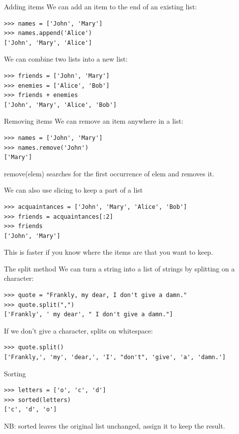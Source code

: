 \documentclass[aspectratio=169,usenames,dvipsnames]{beamer}
\begin{document}
\begin{frame}[fragile]{Adding items}
We can add an item to the end of an existing list:
\begin{lstlisting} 
>>> names = ['John', 'Mary']
>>> names.append('Alice')
['John', 'Mary', 'Alice']
\end{lstlisting}

\pause
We can combine two lists into a new list:
\begin{lstlisting} 
>>> friends = ['John', 'Mary']
>>> enemies = ['Alice', 'Bob']
>>> friends + enemies
['John', 'Mary', 'Alice', 'Bob']
\end{lstlisting}
\end{frame}


\begin{frame}[fragile]{Removing items}
We can remove an item anywhere in a list:
\begin{lstlisting} 
>>> names = ['John', 'Mary']
>>> names.remove('John')
['Mary']
\end{lstlisting}

    remove(elem) searches for the first occurrence of elem
    and removes it.

\pause
We can also use slicing to keep a part of a list
\begin{lstlisting} 
>>> acquaintances = ['John', 'Mary', 'Alice', 'Bob']
>>> friends = acquaintances[:2]
>>> friends
['John', 'Mary']
\end{lstlisting}

This is faster if you know where the items are that you want to keep.
\end{frame}


\begin{frame}[fragile]{The split method}
We can turn a string into a list of strings
by splitting on a character:
\begin{lstlisting} 
>>> quote = "Frankly, my dear, I don't give a damn."
>>> quote.split(",")
['Frankly', ' my dear', " I don't give a damn."]
\end{lstlisting}

\pause
If we don't give a character, splits on whitespace:
\begin{lstlisting} 
>>> quote.split()
['Frankly,', 'my', 'dear,', 'I', "don't", 'give', 'a', 'damn.']
\end{lstlisting}
\end{frame}


\begin{frame}[fragile]{Sorting}
\begin{lstlisting} 
>>> letters = ['o', 'c', 'd']
>>> sorted(letters)
['c', 'd', 'o']
\end{lstlisting}

NB: sorted leaves the original list unchanged,
assign it to keep the result.
\end{frame}
\end{document}
